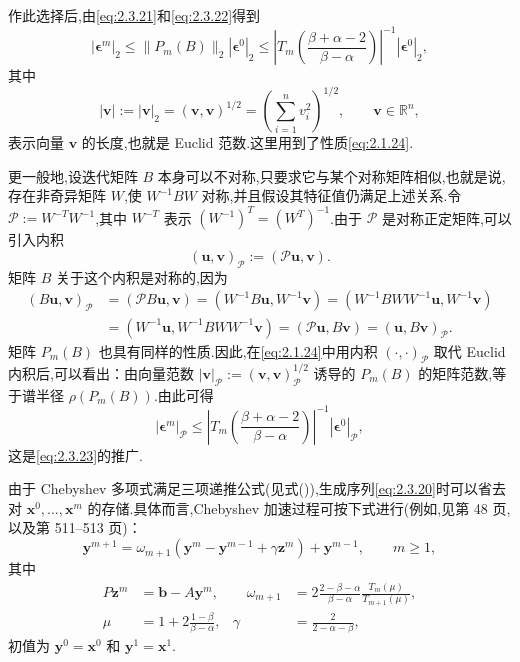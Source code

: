 作此选择后,由\eqref{eq:2.3.21}和\eqref{eq:2.3.22}得到
\begin{equation}\label{eq:2.3.23}
  |\boldsymbol{\epsilon}^m|_2\le\|P_m(B)\|_2|\boldsymbol{\epsilon}^0|_2
  \le\left|T_m\!\left(\frac{\beta+\alpha-2}{\beta-\alpha}\right)\right|^{-1}
      |\boldsymbol{\epsilon}^0|_2,
\end{equation}
其中
\[
  |\boldsymbol{v}|:=|\boldsymbol{v}|_2=(\boldsymbol{v},\boldsymbol{v})^{1/2}
  =\left(\sum_{i=1}^n v_i^2\right)^{1/2},\qquad \boldsymbol{v}\in\mathbb R^n,
\]
表示向量 \(\boldsymbol{v}\) 的长度,也就是 Euclid 范数.这里用到了性质\eqref{eq:2.1.24}.

更一般地,设迭代矩阵 \(B\) 本身可以不对称,只要求它与某个对称矩阵相似,也就是说,存在非奇异矩阵 \(W\),使 \(W^{-1}BW\) 对称,并且假设其特征值仍满足上述关系.令 \(\mathcal P:=W^{-T}W^{-1}\),其中 \(W^{-T}\) 表示 \((W^{-1})^T=(W^T)^{-1}\).由于 \(\mathcal P\) 是对称正定矩阵,可以引入内积
\[
  (\boldsymbol{u},\boldsymbol{v})_{\mathcal P}:=(\mathcal P\boldsymbol{u},\boldsymbol{v}).
\]
矩阵 \(B\) 关于这个内积是对称的,因为
\[
  \begin{aligned}
    (B\boldsymbol{u},\boldsymbol{v})_{\mathcal P}
    &=(\mathcal PB\boldsymbol{u},\boldsymbol{v})
     =(W^{-1}B\boldsymbol{u},W^{-1}\boldsymbol{v})
     =(W^{-1}BWW^{-1}\boldsymbol{u},W^{-1}\boldsymbol{v})\\
    &=(W^{-1}\boldsymbol{u},W^{-1}BWW^{-1}\boldsymbol{v})
     =(\mathcal P\boldsymbol{u},B\boldsymbol{v})=(\boldsymbol{u},B\boldsymbol{v})_{\mathcal P}.
  \end{aligned}
\]
矩阵 \(P_m(B)\) 也具有同样的性质.因此,在\eqref{eq:2.1.24}中用内积 \((\cdot,\cdot)_{\mathcal P}\) 取代 Euclid 内积后,可以看出：由向量范数 \(|\boldsymbol{v}|_{\mathcal P}:=(\boldsymbol{v},\boldsymbol{v})_{\mathcal P}^{1/2}\) 诱导的 \(P_m(B)\) 的矩阵范数,等于谱半径 \(\rho(P_m(B))\).由此可得
\begin{equation}\label{eq:2.3.24}
  |\boldsymbol{\epsilon}^m|_{\mathcal P}
  \le\left|T_m\!\left(\frac{\beta+\alpha-2}{\beta-\alpha}\right)\right|^{-1}
      |\boldsymbol{\epsilon}^0|_{\mathcal P},
\end{equation}
这是\eqref{eq:2.3.23}的推广.

由于 Chebyshev 多项式满足三项递推公式(见式()),生成序列\eqref{eq:2.3.20}时可以省去对 \(\boldsymbol{x}^0,\ldots,\boldsymbol{x}^m\) 的存储.具体而言,Chebyshev 加速过程可按下式进行(例如,见第 48 页,以及第 511–513 页)：
\begin{equation}\label{eq:2.3.25}
  \boldsymbol{y}^{m+1}=\omega_{m+1}(\boldsymbol{y}^m-\boldsymbol{y}^{m-1}+\gamma\boldsymbol{z}^m)+\boldsymbol{y}^{m-1},
  \qquad m\ge1,
\end{equation}
其中
\[
  \begin{aligned}
    P\boldsymbol{z}^m&=\boldsymbol{b}-A\boldsymbol{y}^m,
    &\quad\omega_{m+1}&=2\frac{2-\beta-\alpha}{\beta-\alpha}\frac{T_m(\mu)}{T_{m+1}(\mu)},\\
    \mu&=1+2\frac{1-\beta}{\beta-\alpha},
    &\gamma&=\frac2{2-\alpha-\beta},
  \end{aligned}
\]
初值为 \(\boldsymbol{y}^0=\boldsymbol{x}^0\) 和 \(\boldsymbol{y}^1=\boldsymbol{x}^1\).

